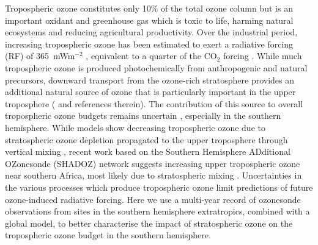 \documentclass[acp, manuscript]{copernicus} %
\begin{document}
\introduction  %
%

  Tropospheric ozone constitutes only 10\% of the total ozone column but is an important oxidant and greenhouse gas which is toxic to life, harming natural ecosystems and reducing agricultural productivity.
  Over the industrial period, increasing tropospheric ozone has been estimated to exert a radiative forcing (RF) of 365~mWm$^{-2}$  \citep{Stevenson2013}, equivalent to a quarter of the CO$_2$ forcing \citep{IPCC_Chapter2}. 
  While much tropospheric ozone is produced photochemically from anthropogenic and natural precursors, %
  downward transport from the ozone-rich stratosphere provides an additional natural source of ozone that is particularly important in the upper troposphere (\citet{Jacobson2000} and references therein).
  The contribution of this source to overall tropospheric ozone budgets remains uncertain \citep{Skerlak2014}, especially in the southern hemisphere.
  While models show decreasing tropospheric ozone due to stratospheric ozone depletion propagated to the upper troposphere through vertical mixing \citep{Stevenson2013}, recent work based on the Southern Hemisphere ADditional OZonesonde (SHADOZ) network suggests increasing upper tropospheric ozone near southern Africa, most likely due to stratospheric mixing \citep{Liu2015, Thompson2014}.
  Uncertainties in the various processes which produce tropospheric ozone limit predictions of future ozone-induced radiative forcing.
  Here we use a multi-year record of ozonesonde observations from sites in the southern hemisphere extratropics, combined with a global model, to better characterise the impact of stratospheric ozone on the tropospheric ozone budget in the southern hemisphere.
\end{document}
